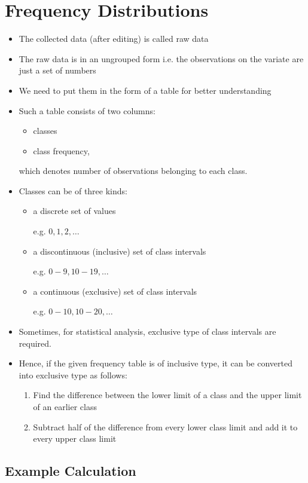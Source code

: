 \documentclass[
10pt, %
a4paper, %
]{report}
\begin{document}
\section*{Frequency Distributions}
\begin{itemize}
\item The collected data (after editing) is
called raw data
\item The raw data is in an ungrouped form i.e. the observations on the variate are just a set of numbers
\item We need to put them in the form of a table for better understanding
\item Such a table consists of two columns:
\begin{itemize}
\item classes
\item class frequency,
\end{itemize}
which denotes number of observations belonging to
each class.
\item Classes can be of three kinds:
\begin{itemize}
\item a discrete set of values
\item[e.g.] \(0, 1, 2, \dots\)
\item a discontinuous (inclusive) set of class intervals
\item[e.g.] \(0-9, 10-19, \dots\)
\item a continuous (exclusive) set of class intervals
\item[e.g.] \(0-10, 10-20, \dots\)
\end{itemize}
\item Sometimes, for statistical analysis, exclusive type of class intervals are required.
\item Hence, if the given frequency table is of inclusive type, it can be converted into exclusive type as follows:
\begin{enumerate}
\item Find the difference between the lower limit of a class and the upper limit of an earlier class
\item Subtract half of the difference from every lower class limit and add it to every upper class limit
\end{enumerate}
\end{itemize}

\subsection*{Example Calculation}
\end{document}

